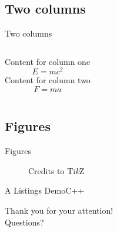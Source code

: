 \documentclass[
10pt,
aspectratio=169,
]{beamer}
\begin{document}
\subsection{Two columns}
\begin{frame}[c]{Two columns}
	
\begin{columns}[onlytextwidth]
	Content for column one
	\begin{equation}
	E = mc^2
	\end{equation}
	Content for column two
	\begin{equation}
	F=ma
	\end{equation}
\end{columns}
	
\end{frame}	

\subsection{Figures}
\begin{frame}[c]{Figures}
	\begin{figure}
		\centering
		\caption{Credits to Ti\textit{k}Z}
	\end{figure}
\end{frame}	

\begin{frame}{A Listings Demo}{C++}
	\lstI
\end{frame}
\begin{frame}[plain]
	\vfill
	\centering
	{
		\centering \Huge \color{white} Thank you for your attention!\\[10pt]Questions?
	}
	\vfill
\end{frame}
\end{document}
